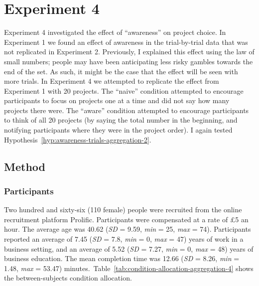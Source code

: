 \documentclass[a4paper, nobind, dvipsnames]{templates/ociamthesis}
\theoremstyle{definition}
\theoremstyle{definition}
\theoremstyle{definition}
\theoremstyle{definition}
\theoremstyle{remark}
\begin{document}
\hypertarget{aggregation-4}{%
\section{Experiment 4}\label{aggregation-4}}

Experiment 4 investigated the effect of ``awareness'' on project choice. In
Experiment 1 we found an effect of awareness in the trial-by-trial data that was
not replicated in Experiment 2. Previously, I explained this effect using the
law of small numbers; people may have been anticipating less risky gambles
towards the end of the set. As such, it might be the case that the effect will
be seen with more trials. In Experiment 4 we attempted to replicate the effect
from Experiment 1 with 20 projects. The ``naive'' condition attempted to encourage
participants to focus on projects one at a time and did not say how many
projects there were. The ``aware'' condition attempted to encourage participants
to think of all 20 projects (by saying the total number in the beginning, and
notifying participants where they were in the project order). I again tested Hypothesis~\ref{hyp:awareness-trials-aggregation-2}.

\subsection{Method}

\subsubsection{Participants}

Two hundred and sixty-six (110 female) people were recruited from the online recruitment platform Prolific. Participants were compensated at a rate of £5 an hour. The average age was 40.62 (\emph{SD} = 9.59, \emph{min} = 25, \emph{max} = 74). Participants reported an average of 7.45 (\emph{SD} = 7.8, \emph{min} = 0, \emph{max} = 47) years of work in a business setting, and an average of 5.52 (\emph{SD} = 7.27, \emph{min} = 0, \emph{max} = 48) years of business education. The mean completion time was 12.66 (\emph{SD} = 8.26, \emph{min} = 1.48, \emph{max} = 53.47) minutes.~Table~\ref{tab:condition-allocation-aggregation-4}
shows the between-subjects condition allocation.
\end{document}
